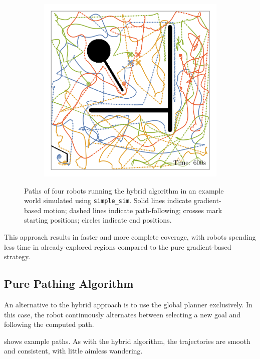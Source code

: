 \begin{figure}[H]
\begin{subfigure}[b]{\w}
    \end{subfigure}
    \begin{subfigure}[b]{\w}
        \centering
        \includegraphics[width=\textwidth]{./figures/plots/paths/search:hybrid-paths-(after-600s).png}
    \end{subfigure}
    \caption{Paths of four robots running the hybrid algorithm in an example world simulated using \texttt{simple\_sim}. Solid lines indicate gradient-based motion; dashed lines indicate path-following; crosses mark starting positions; circles indicate end positions.}
    \label{fig:hybrid-paths}
\end{figure}

This approach results in faster and more complete coverage, with robots spending less time in already-explored regions compared to the pure gradient-based strategy.

\subsection{Pure Pathing Algorithm}
An alternative to the hybrid approach is to use the global planner exclusively. In this case, the robot continuously alternates between selecting a new goal and following the computed path.

 shows example paths. As with the hybrid algorithm, the trajectories are smooth and consistent, with little aimless wandering.


